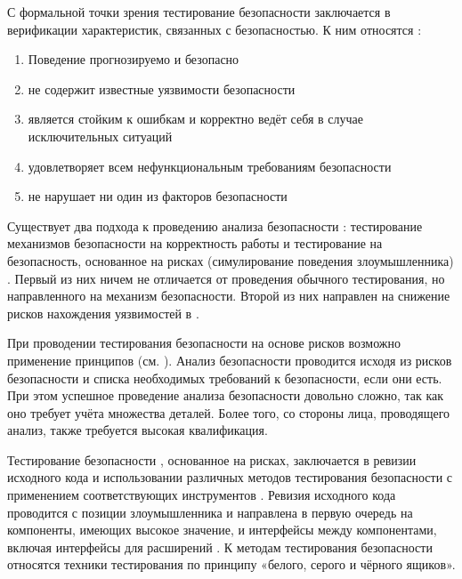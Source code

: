 %
С формальной точки зрения тестирование безопасности  заключается в верификации характеристик, связанных с безопасностью. 
%
К ним относятся :
\begin{enumerate}
	\setlength{\itemsep}{0pt}%

	\item Поведение  прогнозируемо и безопасно
	
	\item {} не содержит известные уязвимости безопасности
	
	\item {} является стойким к ошибкам и корректно ведёт себя в случае исключительных ситуаций

	\item {} удовлетворяет всем нефункциональным требованиям безопасности

	\item {} не нарушает ни один из факторов безопасности
\end{enumerate}

%
Существует два подхода к проведению анализа безопасности : тестирование механизмов безопасности на корректность работы и тестирование  на безопасность, основанное на рисках (симулирование поведения злоумышленника) . 
%
Первый из них ничем не отличается от проведения обычного тестирования, но направленного на механизм безопасности. 
%
Второй из них направлен на снижение рисков нахождения уязвимостей в .

%
При проводении тестирования безопасности  на основе рисков возможно применение принципов  (см. ). 
%
Анализ безопасности проводится исходя из рисков безопасности и списка необходимых требований к безопасности, если они есть. 
%
При этом успешное проведение анализа безопасности довольно сложно, так как оно требует учёта множества деталей. 
%
Более того, со стороны лица, проводящего анализ, также требуется высокая квалификация.

%
Тестирование безопасности , основанное на рисках, заключается в ревизии исходного кода и использовании различных методов тестирования безопасности с применением соответствующих инструментов . 
%
Ревизия исходного кода проводится с позиции злоумышленника и направлена в первую очередь на компоненты, имеющих высокое значение, и интерфейсы между компонентами, включая интерфейсы для расширений . 
%
К методам тестирования безопасности относятся техники тестирования по принципу «белого, серого и чёрного ящиков».

